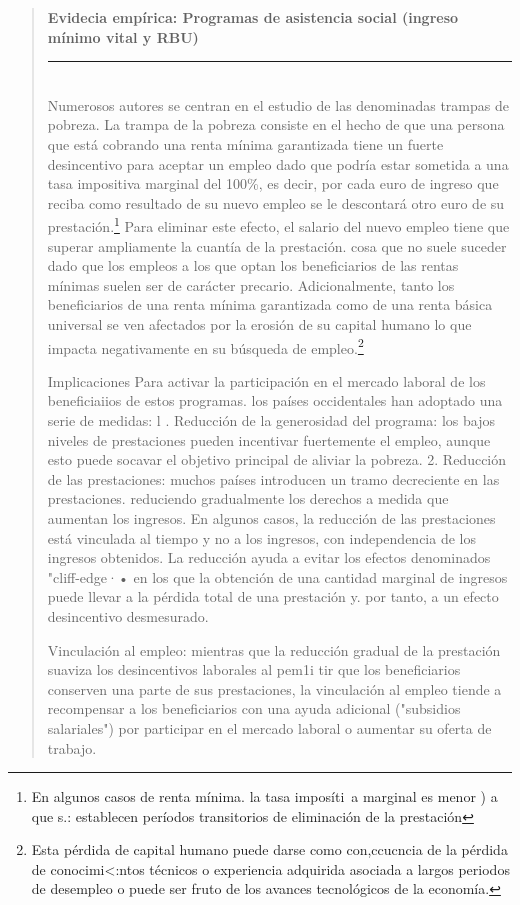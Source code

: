 \documentclass[10pt,a4paper]{article}
\newenvironment{specialblock}[1]{%
      \begin{quote} %
      \small %
      \noindent\textbf{#1}\\[-0.3em] %
      \rule{\linewidth}{0.4pt}\\[0.6em]}{
      \end{quote}}
\begin{document}
\begin{specialblock}{Evidecia empírica: Programas de asistencia social (ingreso mínimo vital y RBU)}
    Numerosos autores se centran en el estudio de las denominadas trampas de pobreza. La trampa de la pobreza consiste en el hecho de que una persona que está cobrando una renta mínima garantizada tiene un fuerte desincentivo para aceptar un empleo dado que podría estar sometida a una tasa impositiva marginal del 100\%, es decir, por cada euro de ingreso que reciba como resultado de su nuevo empleo se le descontará otro euro de su prestación.\footnote{%
        En algunos casos de renta mínima. la tasa imposíti\ a marginal es menor ) a que s.: establecen períodos transitorios de eliminación de la prestación
    } Para eliminar este efecto, el salario del nuevo empleo tiene que superar ampliamente la cuantía de la prestación. cosa que no suele suceder dado que los empleos a los que optan los beneficiarios de las rentas mínimas suelen ser de carácter precario. Adicionalmente, tanto los beneficiarios de una renta mínima garantizada como de una renta básica universal se ven afectados por la erosión de su capital humano lo que impacta negativamente en su búsqueda de empleo.\footnote{%
        Esta pérdida de capital humano puede darse como con,ccucncia de la pérdida de conocimi<:ntos técnicos o experiencia adquirida asociada a largos periodos de desempleo o puede ser fruto de los avances tecnológicos de la economía.
    }
    
    Implicaciones
    Para activar la participación en el mercado laboral de los beneficiaiios de estos programas. los países occidentales han adoptado una serie de medidas:
    l . Reducción de la generosidad del programa: los bajos niveles de prestaciones pueden incentivar fuertemente el empleo, aunque esto puede socavar el objetivo principal de aliviar la pobreza.
    2. Reducción de las prestaciones: muchos países introducen un tramo decreciente en las prestaciones. reduciendo gradualmente los derechos a medida que aumentan los ingresos. En algunos casos, la reducción de las prestaciones está vinculada al tiempo y no a los ingresos, con independencia de los ingresos obtenidos. La reducción ayuda a evitar los efectos denominados "cliff-edge·• en los que la obtención de una cantidad marginal de ingresos puede llevar a la pérdida total de una prestación y. por tanto, a un efecto desincentivo desmesurado.
    
    Vinculación al empleo: mientras que la reducción gradual de la prestación suaviza los desincentivos laborales al pem1i tir que los beneficiarios conserven una parte de sus prestaciones, la vinculación al empleo tiende a recompensar a los beneficiarios con una ayuda adicional ("subsidios salariales") por participar en el mercado laboral o aumentar su oferta de trabajo.
\end{specialblock}
\end{document}
